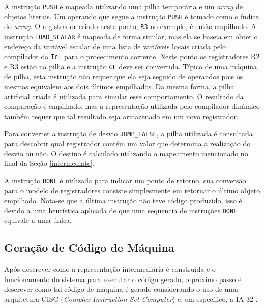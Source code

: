 A instrução \verb!PUSH! é mapeada utilizando uma pilha temporária e
um \textit{array} de objetos literais. Um operando que segue a
instrução \verb!PUSH! é tomado como o índice do \textit{array}.
O registrador criado neste ponto,
\verb!R3! no exemplo, é então empilhado. A instrução \verb!LOAD_SCALAR!
é mapeada de forma similar, mas ela se baseia em obter o
endereço da variável escalar de uma lista de variáveis locais
criada pelo compilador da \texttt{Tcl} para o procedimento
corrente. Neste ponto os registradores R2 e R3 estão na pilha e
a instrução \verb!GE! deve ser convertida. Típico de uma máquina de
pilha, esta instrução não requer que ela seja seguido de operandos
pois os mesmos equivalem aos dois últimos empilhados. Da mesma forma,
a pilha artificial criada é utilizada para simular esse comportamento.
O resultado da comparação é empilhado, mas a representação utilizada
pelo compilador dinâmico também requer que tal resultado seja
armazenado em um novo registrador.

Para converter a instrução de desvio \verb!JUMP_FALSE!, a pilha
utilizada é consultada para descobrir qual registrador contém um valor
que determina a realização do desvio ou não. O destino é calculado
utilizando o mapeamento mencionado no final da Seção \ref{intermediate}.

A instrução \verb!DONE! é utilizada para indicar um ponto de
retorno, sua conversão para o modelo de registradores consiste
simplesmente em retornar o último objeto empilhado. Nota-se que a
última instrução
não teve código produzido, isso é devido a uma heurística aplicada de
que uma sequencia de instruções \verb!DONE! equivale a uma única.

\subsection{Geração de Código de Máquina}
\label{codegen}
Após descrever como a representação intermediária é construída e
o funcionamento do sistema para
executar o código gerado, o próximo passo é descrever como tal
código de máquina é gerado considerando o uso de uma arquitetura CISC
(\textit{Complex Instruction Set Computer}) e, em específico, a
IA-32 \cite{intel_basicarch}.


